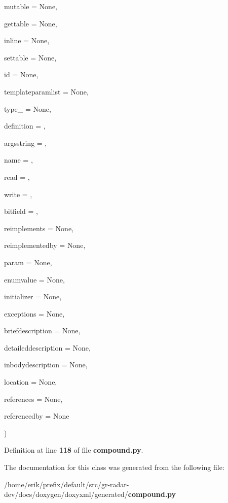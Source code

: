 {\begin{DoxyParamCaption}
\item[{}]{mutable = {\ttfamily None}, }
\item[{}]{gettable = {\ttfamily None}, }
\item[{}]{inline = {\ttfamily None}, }
\item[{}]{settable = {\ttfamily None}, }
\item[{}]{id = {\ttfamily None}, }
\item[{}]{templateparamlist = {\ttfamily None}, }
\item[{}]{type\+\_\+ = {\ttfamily None}, }
\item[{}]{definition = {\ttfamily \textquotesingle{}\textquotesingle{}}, }
\item[{}]{argsstring = {\ttfamily \textquotesingle{}\textquotesingle{}}, }
\item[{}]{name = {\ttfamily \textquotesingle{}\textquotesingle{}}, }
\item[{}]{read = {\ttfamily \textquotesingle{}\textquotesingle{}}, }
\item[{}]{write = {\ttfamily \textquotesingle{}\textquotesingle{}}, }
\item[{}]{bitfield = {\ttfamily \textquotesingle{}\textquotesingle{}}, }
\item[{}]{reimplements = {\ttfamily None}, }
\item[{}]{reimplementedby = {\ttfamily None}, }
\item[{}]{param = {\ttfamily None}, }
\item[{}]{enumvalue = {\ttfamily None}, }
\item[{}]{initializer = {\ttfamily None}, }
\item[{}]{exceptions = {\ttfamily None}, }
\item[{}]{briefdescription = {\ttfamily None}, }
\item[{}]{detaileddescription = {\ttfamily None}, }
\item[{}]{inbodydescription = {\ttfamily None}, }
\item[{}]{location = {\ttfamily None}, }
\item[{}]{references = {\ttfamily None}, }
\item[{}]{referencedby = {\ttfamily None}}
\end{DoxyParamCaption}
)}\label{classdoxyxml_1_1generated_1_1compound_1_1memberdefTypeSub_a26e91cdc40f479d92226a0a8a7a2a40a}


Definition at line {\bf 118} of file {\bf compound.\+py}.



The documentation for this class was generated from the following file\+:\begin{DoxyCompactItemize}
\item 
/home/erik/prefix/default/src/gr-\/radar-\/dev/docs/doxygen/doxyxml/generated/{\bf compound.\+py}\end{DoxyCompactItemize}
